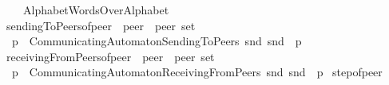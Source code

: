 \begin{isabellebody}
\ \ {\isachardoublequoteopen}{\isasymM}\isactrlsup {\isacharasterisk}{\kern0pt}\ {\isasymequiv}\ Alphabet{\isachardot}{\kern0pt}WordsOverAlphabet\ {\isasymM}{\isachardoublequoteclose}\isanewline
\isanewline
{}\isamarkupfalse%
\ sendingToPeers{\isacharunderscore}{\kern0pt}of{\isacharunderscore}{\kern0pt}peer\ {\isacharcolon}{\kern0pt}{\isacharcolon}{\kern0pt}\ {\isachardoublequoteopen}{\isacharprime}{\kern0pt}peer\ {\isasymRightarrow}\ {\isacharprime}{\kern0pt}peer\ set{\isachardoublequoteclose}\ \ {\isacharparenleft}{\kern0pt}{\isachardoublequoteopen}{\isasymP}\isactrlsub {\isacharbang}{\kern0pt}\ {\isacharunderscore}{\kern0pt}{\isachardoublequoteclose}\ {\isacharbrackleft}{\kern0pt}{}{}{\isacharbrackright}{\kern0pt}\ {}{}{}{\isacharparenright}{\kern0pt}\ \isanewline
\ \ {\isachardoublequoteopen}{\isasymP}\isactrlsub {\isacharbang}{\kern0pt}{\isacharparenleft}{\kern0pt}p{\isacharparenright}{\kern0pt}\ {\isasymequiv}\ CommunicatingAutomaton{\isachardot}{\kern0pt}SendingToPeers\ {\isacharparenleft}{\kern0pt}snd\ {\isacharparenleft}{\kern0pt}snd\ {\isacharparenleft}{\kern0pt}{\isasymA}\ p{\isacharparenright}{\kern0pt}{\isacharparenright}{\kern0pt}{\isacharparenright}{\kern0pt}{\isachardoublequoteclose}\isanewline
\isanewline
{}\isamarkupfalse%
\ receivingFromPeers{\isacharunderscore}{\kern0pt}of{\isacharunderscore}{\kern0pt}peer\ {\isacharcolon}{\kern0pt}{\isacharcolon}{\kern0pt}\ {\isachardoublequoteopen}{\isacharprime}{\kern0pt}peer\ {\isasymRightarrow}\ {\isacharprime}{\kern0pt}peer\ set{\isachardoublequoteclose}\ \ {\isacharparenleft}{\kern0pt}{\isachardoublequoteopen}{\isasymP}\isactrlsub {\isacharquery}{\kern0pt}\ {\isacharunderscore}{\kern0pt}{\isachardoublequoteclose}\ {\isacharbrackleft}{\kern0pt}{}{}{\isacharbrackright}{\kern0pt}\ {}{}{}{\isacharparenright}{\kern0pt}\ \isanewline
\ \ {\isachardoublequoteopen}{\isasymP}\isactrlsub {\isacharquery}{\kern0pt}{\isacharparenleft}{\kern0pt}p{\isacharparenright}{\kern0pt}\ {\isasymequiv}\ CommunicatingAutomaton{\isachardot}{\kern0pt}ReceivingFromPeers\ {\isacharparenleft}{\kern0pt}snd\ {\isacharparenleft}{\kern0pt}snd\ {\isacharparenleft}{\kern0pt}{\isasymA}\ p{\isacharparenright}{\kern0pt}{\isacharparenright}{\kern0pt}{\isacharparenright}{\kern0pt}{\isachardoublequoteclose}\isanewline
\isanewline
{}\isamarkupfalse%
\ step{\isacharunderscore}{\kern0pt}of{\isacharunderscore}{\kern0pt}peer\isanewline

\end{isabellebody}
